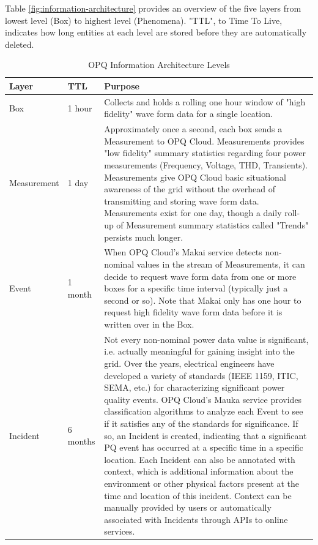 Table \ref{fig:information-architecture} provides an overview of the five layers from lowest level (Box) to highest level (Phenomena). "TTL", to Time To Live, indicates how long entities at each level are stored before they are automatically deleted.

\begin{table}[H]
\caption{OPQ Information Architecture Levels}
\centering
\begin{tabular}{llp{4in}}
\toprule
\textbf{Layer}	& \textbf{TTL}	& \textbf{Purpose}\\
\midrule
Box		& 1 hour			& Collects and holds a rolling one hour window of "high fidelity" wave form data for a single location.\\
Measurement		& 1 day			& Approximately once a second, each box sends a Measurement to OPQ Cloud. Measurements provides "low fidelity" summary statistics regarding four power measurements (Frequency, Voltage, THD, Transients). Measurements give OPQ Cloud basic situational awareness of the grid without the overhead of transmitting and storing wave form data. Measurements exist for one day, though a daily roll-up of Measurement summary statistics called "Trends" persists much longer.\\
Event & 1 month & When OPQ Cloud's Makai service detects non-nominal values in the stream of Measurements, it can decide to request wave form data from one or more boxes for a specific time interval (typically just a second or so). Note that Makai only has one hour to request high fidelity wave form data before it is written over in the Box.\\
Incident & 6 months & Not every non-nominal power data value is significant, i.e. actually meaningful for gaining insight into the grid. Over the years, electrical engineers have developed a variety of standards (IEEE 1159, ITIC, SEMA, etc.) for characterizing significant power quality events. OPQ Cloud's Mauka service provides classification algorithms to analyze each Event to see if it satisfies any of the standards for significance. If so, an Incident is created, indicating that a significant PQ event has occurred at a specific time in a specific location. Each Incident can also be annotated with context, which is additional information about the environment or other physical factors present at the time and location of this incident. Context can be manually provided by users or automatically associated with Incidents through APIs to online services.\\

\end{tabular}
\end{table}
